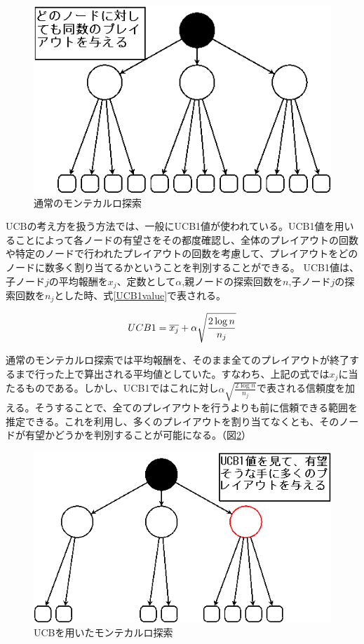 \begin{figure}[h]
 \centering
 \includegraphics[keepaspectratio, scale=0.7,bb=0 0 330 260]
      {img/monte.png}
 \caption{通常のモンテカルロ探索}
 \label{d_monte}
\end{figure}

UCBの考え方を扱う方法では、一般にUCB1値が使われている。UCB1値を用いることによって各ノードの有望さをその都度確認し、全体のプレイアウトの回数や特定のノードで行われたプレイアウトの回数を考慮して、プレイアウトをどのノードに数多く割り当てるかということを判別することができる。
UCB1値は、子ノード$j$の平均報酬を${x_{j}}$、定数として$α$,親ノードの探索回数を$n$,子ノード$j$の探索回数を${n_{j}}$とした時、式\ref{UCB1value}で表される。

\begin{equation}
\label{UCB1value}
\Large UCB1 = \overline {x_{j}}+\alpha \sqrt {\displaystyle \frac {2\log{n}} {n_{j}}}
\end{equation}

通常のモンテカルロ探索では平均報酬を、そのまま全てのプレイアウトが終了するまで行った上で算出される平均値としていた。すなわち、上記の式では${x_{j}}$に当たるものである。しかし、UCB1ではこれに対し$\alpha \sqrt {\frac {2\log{n}} {n_{j}}}$で表される信頼度を加える。そうすることで、全てのプレイアウトを行うよりも前に信頼できる範囲を推定できる。これを利用し、多くのプレイアウトを割り当てなくとも、そのノードが有望かどうかを判別することが可能になる。（図\ref{ucb_monte}）

\begin{figure}[h]
 \centering
 \includegraphics[keepaspectratio, scale=0.7,bb=0 0 330 260]
      {img/monteUCB.png}
 \caption{UCBを用いたモンテカルロ探索}
 \label{ucb_monte}
\end{figure}


